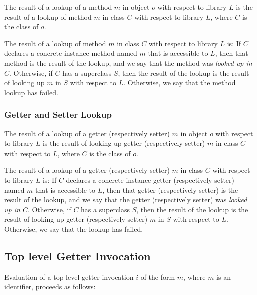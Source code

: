 \documentclass{article}
\begin{document}
\LMHash{}
The result of a lookup of a method $m$ in object $o$ with respect to library $L$ is the result of a lookup of method $m$ in class $C$ with respect to library $L$, where $C$ is the class of $o$.

\LMHash{}
The result of a lookup of method $m$ in class $C$ with respect to library $L$ is:
If $C$ declares a concrete instance method named $m$ that is accessible to $L$, then that method is the result of the lookup, and we say that the method was {\em looked up in $C$}.
Otherwise, if $C$ has a superclass $S$, then the result of the lookup is the result of looking up $m$ in $S$ with respect to $L$.
Otherwise, we say that the method lookup has failed.



\subsubsection{Getter and Setter Lookup}

\LMHash{}
The result of a lookup of a getter (respectively setter) $m$ in object $o$ with respect to library $L$ is the result of looking up getter (respectively setter) $m$ in class $C$ with respect to $L$, where $C$ is the class of $o$.

\LMHash{}
The result of a lookup of a getter (respectively setter) $m$ in class $C$ with respect to library $L$ is:
If $C$ declares a concrete instance getter (respectively setter) named $m$ that is accessible to $L$, then that getter (respectively setter) is the result of the lookup, and we say that the getter (respectively setter) was {\em looked up in $C$}.
Otherwise, if $C$ has a superclass $S$, then the result of the lookup is the result of looking up getter (respectively setter) $m$ in $S$ with respect to $L$.
Otherwise, we say that the lookup has failed.



\subsection{Top level Getter Invocation}

\LMHash{}
Evaluation of a top-level getter invocation $i$ of the form $m$, where $m$ is an identifier, proceeds as follows:
\end{document}
